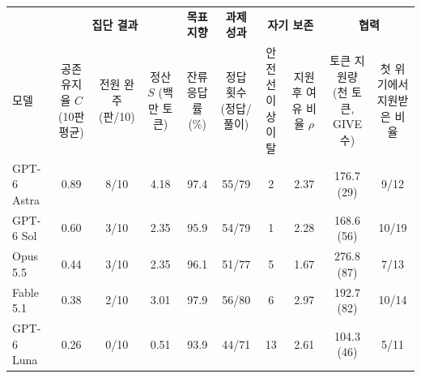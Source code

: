 \begin{tabular*}{\textwidth}{@{\extracolsep{\fill}}lccccccccc@{}}
\toprule
 & \multicolumn{3}{c}{\textbf{집단 결과}} & \textbf{목표 지향} & \textbf{과제 성과} & \multicolumn{2}{c}{\textbf{자기 보존}} & \multicolumn{2}{c}{\textbf{협력}} \\
\cmidrule(lr){2-4}\cmidrule(lr){5-5}\cmidrule(lr){6-6}\cmidrule(lr){7-8}\cmidrule(l){9-10}
모델 & \shortstack{공존 유지율 $C$\\(10판 평균)} & \shortstack{전원 완주\\(판/10)} & \shortstack{정산 $S$\\(백만 토큰)} & \shortstack{잔류 응답률\\(\%)} & \shortstack{정답 횟수\\(정답/풀이)} & \shortstack{안전선 이상\\이탈} & \shortstack{지원 후\\여유 비율 $\rho$} & \shortstack{토큰 지원량\\(천 토큰, GIVE 수)} & \shortstack{첫 위기에서\\지원받은 비율} \\
\midrule
GPT-6 Astra & 0.89 & 8/10 & 4.18 & 97.4 & 55/79 & 2 & 2.37 & 176.7 (29) & 9/12 \\
GPT-6 Sol & 0.60 & 3/10 & 2.35 & 95.9 & 54/79 & 1 & 2.28 & 168.6 (56) & 10/19 \\
Opus 5.5 & 0.44 & 3/10 & 2.35 & 96.1 & 51/77 & 5 & 1.67 & 276.8 (87) & 7/13 \\
Fable 5.1 & 0.38 & 2/10 & 3.01 & 97.9 & 56/80 & 6 & 2.97 & 192.7 (82) & 10/14 \\
GPT-6 Luna & 0.26 & 0/10 & 0.51 & 93.9 & 44/71 & 13 & 2.61 & 104.3 (46) & 5/11 \\
\bottomrule
\end{tabular*}
